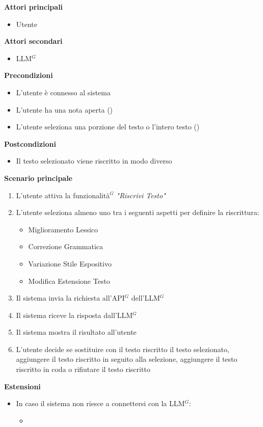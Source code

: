 \documentclass[a4paper,10pt]{article}
\begin{document}
    \textbf{Attori principali}
    \begin{itemize}
        \item Utente
    \end{itemize}
    \textbf{Attori secondari}
    \begin{itemize}
        \item LLM$^G$
    \end{itemize}
    \textbf{Precondizioni}
    \begin{itemize}
        \item L'utente è connesso al sistema
        \item L'utente ha una nota aperta ()
        \item L'utente seleziona una porzione del testo o l'intero testo ()
    \end{itemize}
    \textbf{Postcondizioni}
    \begin{itemize}
        \item Il testo selezionato viene riscritto in modo diverso
    \end{itemize}
    \textbf{Scenario principale}
    \begin{enumerate}
        \item L'utente attiva la funzionalità$^G$ \textit{"Riscrivi Testo"}
        \item L'utente seleziona almeno uno tra i seguenti aspetti per definire la riscrittura:
        \begin{itemize}
            \item Miglioramento Lessico
            \item Correzione Grammatica
            \item Variazione Stile Espositivo
            \item Modifica Estensione Testo
        \end{itemize}
        \item Il sistema invia la richiesta all'API$^G$ dell'LLM$^G$
        \item Il sistema riceve la risposta dall'LLM$^G$
        \item Il sistema mostra il risultato all'utente
        \item L'utente decide se sostituire con il testo riscritto il testo selezionato, aggiungere il testo riscritto in seguito alla selezione, aggiungere il testo riscritto in coda o rifiutare il testo riscritto
    \end{enumerate}
    \textbf{Estensioni}
    \begin{itemize}
        \item In caso il sistema non riesce a connettersi con la LLM$^G$:
        \begin{itemize}
            \item {}
        \end{itemize}
    \end{itemize}
\end{document}
